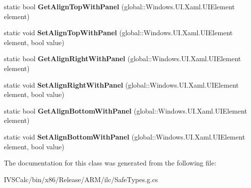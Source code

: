 \begin{DoxyCompactItemize}
static bool {\bfseries Get\+Align\+Top\+With\+Panel} (global\+::\+Windows.\+U\+I.\+Xaml.\+U\+I\+Element element)
\item 
\mbox{\label{class_windows_1_1_u_i_1_1_xaml_1_1_controls_1_1_relative_panel_a30dbaee90a5c315837eeaf26f417b320}} 
static void {\bfseries Set\+Align\+Top\+With\+Panel} (global\+::\+Windows.\+U\+I.\+Xaml.\+U\+I\+Element element, bool value)
\item 
\mbox{\label{class_windows_1_1_u_i_1_1_xaml_1_1_controls_1_1_relative_panel_ae3766e96075e9f3f5c1aec5f5d7a97cb}} 
static bool {\bfseries Get\+Align\+Right\+With\+Panel} (global\+::\+Windows.\+U\+I.\+Xaml.\+U\+I\+Element element)
\item 
\mbox{\label{class_windows_1_1_u_i_1_1_xaml_1_1_controls_1_1_relative_panel_ad7c025028b52f2ddf66289f89611fc2d}} 
static void {\bfseries Set\+Align\+Right\+With\+Panel} (global\+::\+Windows.\+U\+I.\+Xaml.\+U\+I\+Element element, bool value)
\item 
\mbox{\label{class_windows_1_1_u_i_1_1_xaml_1_1_controls_1_1_relative_panel_a5e7cb6ab9a90cb2896e3457bc67ca59b}} 
static bool {\bfseries Get\+Align\+Bottom\+With\+Panel} (global\+::\+Windows.\+U\+I.\+Xaml.\+U\+I\+Element element)
\item 
\mbox{\label{class_windows_1_1_u_i_1_1_xaml_1_1_controls_1_1_relative_panel_a52f3e04276443ca31df8ca10c97cfb60}} 
static void {\bfseries Set\+Align\+Bottom\+With\+Panel} (global\+::\+Windows.\+U\+I.\+Xaml.\+U\+I\+Element element, bool value)
\end{DoxyCompactItemize}


The documentation for this class was generated from the following file\+:\begin{DoxyCompactItemize}
\item 
I\+V\+S\+Calc/bin/x86/\+Release/\+A\+R\+M/ilc/Safe\+Types.\+g.\+cs\end{DoxyCompactItemize}
